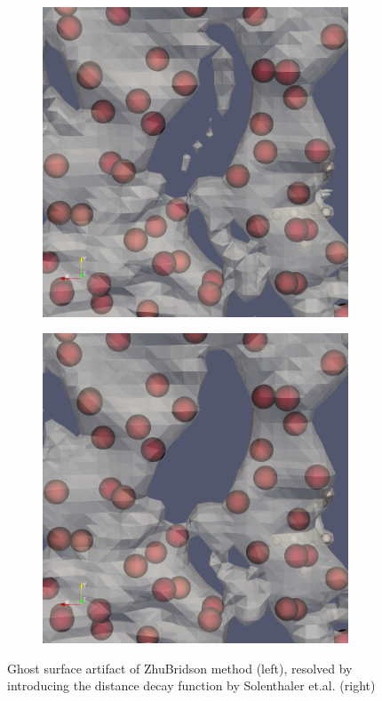 \begin{figure}[H]
	\begin{center}
		\begin{subfigure}[b]{0.45\textwidth}
			\includegraphics[width=\textwidth]{figures/GhostSurfaceZhuBridson.png}
		\end{subfigure}
		\begin{subfigure}[b]{0.45\textwidth}
			\includegraphics[width=\textwidth]{figures/GhostSurfaceSolenthaler.png}
		\end{subfigure}
	\end{center}
	\caption{Ghost surface artifact of ZhuBridson method (left), resolved by introducing the  distance decay function by Solenthaler et.al. (right)}
	\label{fig:ZB_vs_Solenthaler}
\end{figure}
